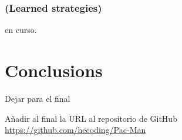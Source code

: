 \documentclass{llncs}
\begin{document}
\subsubsection{(Learned strategies)}
{\color{red} en curso.}

%
\section{Conclusions}
\label{sec:conclusions}
%


Dejar para el final

Añadir al final la URL al repositorio de GitHub
\url{https://github.com/hecoding/Pac-Man}



\end{document}

